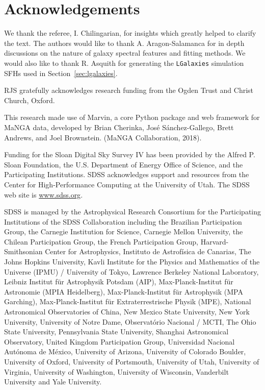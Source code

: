 \documentclass[useAMS,usenatbib]{mn2e}
\def\refereeii		{\color{refer2}}
\begin{document}
\section*{Acknowledgements}

{\refereeii We thank the referee, I. Chilingarian, for insights which greatly helped to clarify the text.} The authors would like to thank A. Aragon-Salamanca for in depth discussions on the nature of galaxy spectral features and fitting methods. We would also like to thank R. Asquith for generating the \texttt{LGalaxies} simulation SFHs used in Section~\ref{sec:lgalaxies}.

RJS gratefully acknowledges research funding from the Ogden Trust and Christ Church, Oxford. 

This research made use of Marvin, a core Python package and web framework for MaNGA data, developed by Brian Cherinka, Jos\'e S\'anchez-Gallego, Brett Andrews, and Joel Brownstein. (MaNGA Collaboration, 2018).

Funding for the Sloan Digital Sky Survey IV has been provided by the Alfred P. Sloan Foundation, the U.S. Department of Energy Office of Science, and the Participating Institutions. SDSS acknowledges support and resources from the Center for High-Performance Computing at the University of Utah. The SDSS web site is \url{www.sdss.org}.

SDSS is managed by the Astrophysical Research Consortium for the Participating Institutions of the SDSS Collaboration including the Brazilian Participation Group, the Carnegie Institution for Science, Carnegie Mellon University, the Chilean Participation Group, the French Participation Group, Harvard-Smithsonian Center for Astrophysics, Instituto de Astrof\'isica de Canarias, The Johns Hopkins University, Kavli Institute for the Physics and Mathematics of the Universe (IPMU) / University of Tokyo, Lawrence Berkeley National Laboratory, Leibniz Institut für Astrophysik Potsdam (AIP), Max-Planck-Institut f\"ur Astronomie (MPIA Heidelberg), Max-Planck-Institut für Astrophysik (MPA Garching), Max-Planck-Institut f\"ur Extraterrestrische Physik (MPE), National Astronomical Observatories of China, New Mexico State University, New York University, University of Notre Dame, Observat\'orio Nacional / MCTI, The Ohio State University, Pennsylvania State University, Shanghai Astronomical Observatory, United Kingdom Participation Group, Universidad Nacional Aut\'onoma de M\'exico, University of Arizona, University of Colorado Boulder, University of Oxford, University of Portsmouth, University of Utah, University of Virginia, University of Washington, University of Wisconsin, Vanderbilt University and Yale University.



  
\end{document}
